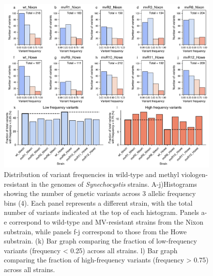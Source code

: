 \documentclass[12pt]{article}
\begin{document}
\begin{figure}[H]
    \centering
    \includegraphics[width=\hsize]{../Figures/WGS/variant_frequency_fraction_comparison_4bins.png}
    \caption{Distribution of variant frequencies in wild-type and methyl viologen-resistant in the genomes of \textit{Synechocystis} strains. A-j)Histograms showing the number of genetic variants across 3 allelic frequency bins (4). Each panel represents a different strain, with the total number of variants indicated at the top of each histogram. Panels a-e correspond to wild-type and MV-resistant strains from the Nixon substrain, while panels f-j correspond to those from the Howe substrain. (k) Bar graph comparing the fraction of low-frequency variants (frequency < 0.25) across all strains. l) Bar graph comparing the fraction of high-frequency variants (frequency > 0.75) across all strains.}
    \label{fig:4bins}
\end{figure}
\end{document}
